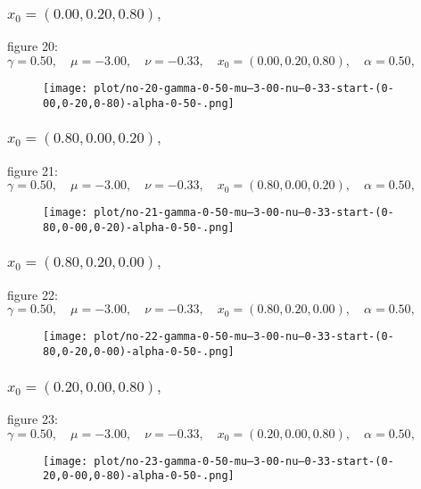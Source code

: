 \documentclass[a4paper]{article}
\begin{document}
\begin{multicols*}{2}
   \subsubsection{\(x_0 = (0.00,0.20,0.80),\quad \)}
   
figure 20: \(\gamma = 0.50,\quad \mu = -3.00,\quad \nu = -0.33,\quad x_0 = (0.00,0.20,0.80),\quad \alpha = 0.50,\quad \)
   \begin{figure}[H]
   \centering
   \texttt{[image: plot/no-20-gamma-0-50-mu--3-00-nu--0-33-start-(0-00,0-20,0-80)-alpha-0-50-.png]}
   \end{figure}
   

   \subsubsection{\(x_0 = (0.80,0.00,0.20),\quad \)}
   
figure 21: \(\gamma = 0.50,\quad \mu = -3.00,\quad \nu = -0.33,\quad x_0 = (0.80,0.00,0.20),\quad \alpha = 0.50,\quad \)
   \begin{figure}[H]
   \centering
   \texttt{[image: plot/no-21-gamma-0-50-mu--3-00-nu--0-33-start-(0-80,0-00,0-20)-alpha-0-50-.png]}
   \end{figure}
   

   \subsubsection{\(x_0 = (0.80,0.20,0.00),\quad \)}
   
figure 22: \(\gamma = 0.50,\quad \mu = -3.00,\quad \nu = -0.33,\quad x_0 = (0.80,0.20,0.00),\quad \alpha = 0.50,\quad \)
   \begin{figure}[H]
   \centering
   \texttt{[image: plot/no-22-gamma-0-50-mu--3-00-nu--0-33-start-(0-80,0-20,0-00)-alpha-0-50-.png]}
   \end{figure}
   

   \subsubsection{\(x_0 = (0.20,0.00,0.80),\quad \)}
   
figure 23: \(\gamma = 0.50,\quad \mu = -3.00,\quad \nu = -0.33,\quad x_0 = (0.20,0.00,0.80),\quad \alpha = 0.50,\quad \)
   \begin{figure}[H]
   \centering
   \texttt{[image: plot/no-23-gamma-0-50-mu--3-00-nu--0-33-start-(0-20,0-00,0-80)-alpha-0-50-.png]}
   \end{figure}
   


\end{multicols*}
\end{document}
